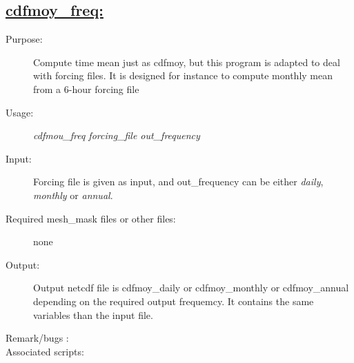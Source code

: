 \documentclass[a4paper,11pt]{article}
\begin{document}
\newpage
\subsection*{\underline{cdfmoy\_freq:}}
\begin{description}
\item[Purpose:] Compute time mean just as cdfmoy, but this program is adapted to deal with forcing files. It is designed for instance to compute monthly mean from a 6-hour forcing file
\item[Usage:] {\em cdfmou\_freq forcing\_file out\_frequency}
\item[Input:] Forcing file is given as input, and out\_frequency can be either {\em daily}, {\em monthly} or {\em annual}. 
\item[Required mesh\_mask files or other files:] none
\item[Output:] Output netcdf file is cdfmoy\_daily or cdfmoy\_monthly or cdfmoy\_annual depending on the required output frequemcy. It contains the same variables than the input file.
\item[Remark/bugs :]
\item[Associated scripts:]
\end{description}

\newpage
\end{document}
